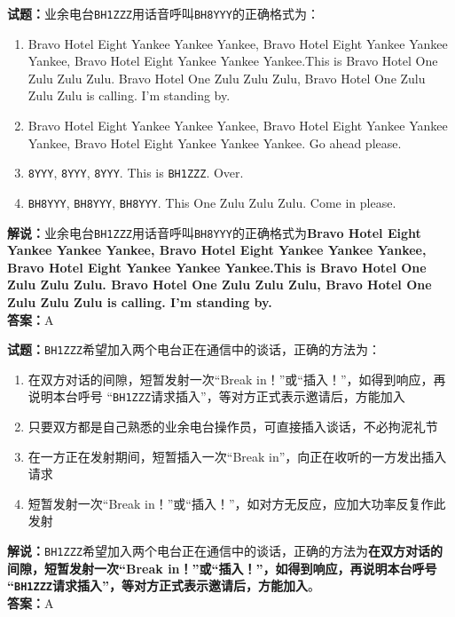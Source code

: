 \documentclass{ctexbook}
\begin{document}
\noindent\textbf{试题：}业余电台\texttt{BH1ZZZ}用话音呼叫\texttt{BH8YYY}的正确格式为：
\begin{enumerate}[leftmargin=3em]
  \item Bravo Hotel Eight Yankee Yankee Yankee, Bravo Hotel Eight Yankee Yankee Yankee, Bravo Hotel Eight Yankee Yankee Yankee.This is Bravo Hotel One Zulu Zulu Zulu. Bravo Hotel One Zulu Zulu Zulu, Bravo Hotel One Zulu Zulu Zulu is calling. I’m standing by.
  \item Bravo Hotel Eight Yankee Yankee Yankee, Bravo Hotel Eight Yankee Yankee Yankee, Bravo Hotel Eight Yankee Yankee Yankee. Go ahead please.
  \item \texttt{8YYY}, \texttt{8YYY}, \texttt{8YYY}. This is \texttt{BH1ZZZ}. Over.
  \item \texttt{BH8YYY}, \texttt{BH8YYY}, \texttt{BH8YYY}. This One Zulu Zulu Zulu. Come in please.
\end{enumerate}
\noindent\textbf{解说：}业余电台\texttt{BH1ZZZ}用话音呼叫\texttt{BH8YYY}的正确格式为\textbf{Bravo Hotel Eight Yankee Yankee Yankee, Bravo Hotel Eight Yankee Yankee Yankee, Bravo Hotel Eight Yankee Yankee Yankee.This is Bravo Hotel One Zulu Zulu Zulu. Bravo Hotel One Zulu Zulu Zulu, Bravo Hotel One Zulu Zulu Zulu is calling. I’m standing by.}\\
\noindent\textbf{答案：}A

\vspace{\baselineskip}

\noindent\textbf{试题：}\texttt{BH1ZZZ}希望加入两个电台正在通信中的谈话，正确的方法为：
\begin{enumerate}[leftmargin=3em]
  \item 在双方对话的间隙，短暂发射一次“Break in！”或“插入！”，如得到响应，再说明本台呼号 “\texttt{BH1ZZZ}请求插入”，等对方正式表示邀请后，方能加入
  \item 只要双方都是自己熟悉的业余电台操作员，可直接插入谈话，不必拘泥礼节
  \item 在一方正在发射期间，短暂插入一次“Break in”，向正在收听的一方发出插入请求
  \item 短暂发射一次“Break in！”或“插入！”，如对方无反应，应加大功率反复作此发射
\end{enumerate}
\noindent\textbf{解说：}\texttt{BH1ZZZ}希望加入两个电台正在通信中的谈话，正确的方法为\textbf{在双方对话的间隙，短暂发射一次“Break in！”或“插入！”，如得到响应，再说明本台呼号 “\texttt{BH1ZZZ}请求插入”，等对方正式表示邀请后，方能加入}。\\
\noindent\textbf{答案：}A
\end{document}
